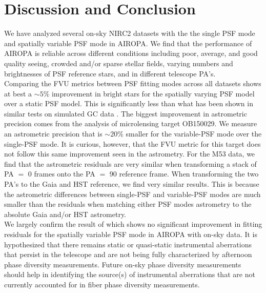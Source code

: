 \documentclass[]{spie}  %
\begin{document}

\section{Discussion and Conclusion} \label{sec:conclusion}

\indent We have analyzed several on-sky NIRC2 datasets with the the single PSF mode and spatially variable PSF mode in AIROPA. We find that the performance of AIROPA is reliable across different conditions including poor, average, and good quality seeing, crowded and/or sparse stellar fields, varying numbers and brightnesses of PSF reference stars, and in different telescope PA's.
\\
\indent Comparing the FVU metrics between PSF fitting modes across all datasets shows at best a ${\sim}5\%$ improvement in bright stars for the spatially varying PSF model over a static PSF model. This is significantly less than what has been shown in similar tests on simulated GC data \citep{Turri:inprep}. The biggest improvement in astrometric precision comes from the analysis of microlensing target OB150029. We measure an astrometric precision that is ${\sim}20\%$ smaller for the variable-PSF mode over the single-PSF mode. It is curious, however, that the FVU metric for this target does not follow this same improvement seen in the astrometry. For the M53 data, we find that the astrometric residuals are very similar when transforming a stack of PA $=$ 0 frames onto the PA $=$ 90 reference frame. When transforming the two PA's to the Gaia and HST reference, we find very similar results. This is because the astrometric differences between single-PSF and variable-PSF modes are much smaller than the residuals when matching either PSF modes astrometry to the absolute Gaia and/or HST astrometry.
\\
\indent We largely confirm the result of \cite{Turri:inprep} which shows no significant improvement in fitting residuals for the spatially variable PSF mode in AIROPA with on-sky data. It is hypothesized that there remains static or quasi-static instrumental aberrations that persist in the telescope and are not being fully characterized by afternoon phase diversity measurements. Future on-sky phase diversity measurements should help in identifying the source(s) of instrumental aberrations that are not currently accounted for in fiber phase diversity measurements. 
\end{document}
